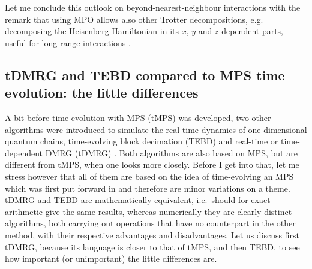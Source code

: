 Let me conclude this outlook on beyond-nearest-neighbour interactions with the remark that using MPO allows also other Trotter decompositions, e.g. decomposing the Heisenberg Hamiltonian in its $x$, $y$ and $z$-dependent parts, useful for long-range interactions \cite{VerstraetePirvu08}. 
 

\subsection{tDMRG and TEBD compared to MPS time evolution: the little differences}
A bit before time evolution with MPS (tMPS) was developed, two other algorithms were introduced to simulate the real-time dynamics of one-dimensional quantum chains, time-evolving block decimation (TEBD)\cite{Vidal03a,Vidal04b} and real-time or time-dependent DMRG (tDMRG) \cite{Daley04,WhiteFeiguin04}. Both algorithms are also based on MPS, but are different from tMPS, when one looks more closely. Before I get into that, let me stress however that all of them are based on the idea of time-evolving an MPS which was first put forward in \cite{Vidal03a,Vidal04b} and therefore are minor variations on a theme. tDMRG and TEBD are mathematically equivalent, i.e.\ should for exact arithmetic give the same results, whereas numerically they are clearly distinct algorithms, both carrying out operations that have no counterpart in the other method, with their respective advantages and disadvantages. Let us discuss first tDMRG, because its language is closer to that of tMPS, and then TEBD, to see how important (or unimportant) the little differences are.

